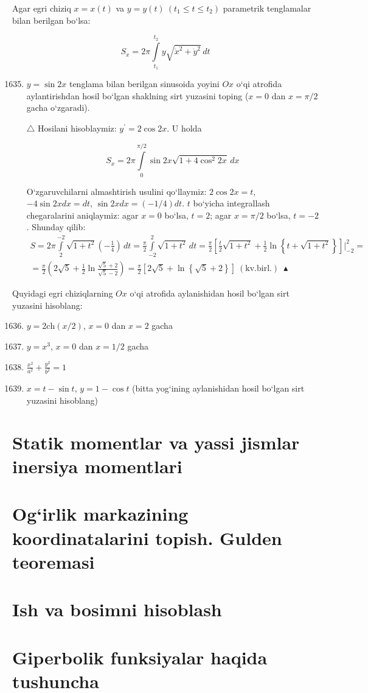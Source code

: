 Agar egri chiziq $x=x(t)$ va $y=y(t)\ (t_1\le t\le t_2)$ parametrik tenglamalar bilan berilgan bo`lsa:

$$S_{x}=2\pi\int\limits_{t_{1}}^{t_{2}}y\sqrt{\dot{x}^{2}+\dot{y}^{2}}\,dt$$
\begin{enumerate} \setcounter{enumi}{1634}
	
	\item $y=\sin 2x$ tenglama bilan berilgan sinusoida yoyini $Ox$ o`qi atrofida aylantirishdan hosil bo`lgan shaklning sirt yuzasini toping ($x=0$ dan $x=\pi/2$ gacha o`zgaradi).
	
	$\triangle$ Hosilani hisoblaymiz: $y^\prime=2\cos 2x$. U holda
	
	$$S_{x}=2\pi\int\limits_{0}^{\pi/2}\sin 2x\sqrt{1+4\cos^2 2x}\, dx$$
	
	O`zgaruvchilarni almashtirish usulini qo`llaymiz: $2\cos 2x=t$, $-4\sin 2x dx=dt$, $\sin 2x dx=(-1/4)dt$. $t$ bo`yicha integrallash chegaralarini aniqlaymiz: agar $x=0$ bo`lsa, $t=2$; agar $x=\pi/2$ bo`lsa, $t=-2$. Shunday qilib:
	\begin{multline*}
	S=2\pi\int\limits_{2}^{-2}\sqrt{1+t^{2}}\left(-\frac{1}{4}\right)\, dt=\frac{\pi}{2}\int\limits_{-2}^{2}\sqrt{1+t^2}\,dt=\frac{\pi}{2}\left[\frac{t}{2}\sqrt{1+t^2}+\frac{1}{2}\ln\left\{t+\sqrt{1+t^2}\right\}\right]\bigg|_{-2}^{2}=\\
	=\frac{\pi}{2}\left(2\sqrt{5}+\frac{1}{2}\ln\frac{\sqrt{5}+2}{\sqrt{5}-2}\right)=\frac{\pi}{2}\left[2\sqrt{5}+\ln\left\{\sqrt{5}+2\right\}\right]\ (\textrm{kv.birl.})\ \blacktriangle
\end{multline*} 
\end{enumerate}

Quyidagi egri chiziqlarning $Ox$ o`qi atrofida aylanishidan hosil bo`lgan sirt yuzasini hisoblang:
\begin{enumerate}\setcounter{enumi}{1635}
	
	\item $y=2\textrm{ch}(x/2)$, $x=0$ dan $x=2$ gacha
	\item $y=x^3$, $x=0$ dan $x=1/2$ gacha
	\item $\frac{x^{2}}{a^{2}}+\frac{y^{2}}{b^{2}}=1$
	\item $x=t-\sin t$, $y=1-\cos t$ (bitta yog`ining aylanishidan hosil bo`lgan sirt yuzasini hisoblang)
	
	
\end{enumerate}


\section{Statik momentlar va yassi jismlar inersiya momentlari}
\section{Og`irlik markazining koordinatalarini topish. Gulden teoremasi}
\section{Ish va bosimni hisoblash}
\section{Giperbolik funksiyalar haqida tushuncha}
